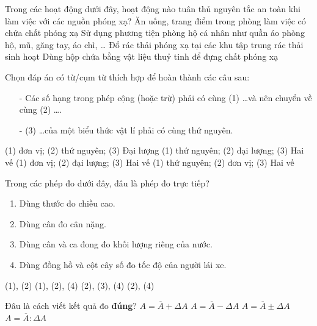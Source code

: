 \begin{ex}
	Trong các hoạt động dưới đây, hoạt động nào tuân thủ nguyên tắc an toàn khi làm việc với các nguồn phóng xạ?
	\choice
	{Ăn uống, trang điểm trong phòng làm việc có chứa chất phóng xạ}
	{\True Sử dụng phương tiện phòng hộ cá nhân như quần áo phòng hộ, mũ, găng tay, áo chì, \dots}
	{Đổ rác thải phóng xạ tại các khu tập trung rác thải sinh hoạt}
	{Dùng hộp chứa bằng vật liệu thuỷ tinh để đựng chất phóng xạ}
	
	\loigiai{}
\end{ex}
\begin{ex}
	Chọn đáp án có từ/cụm từ thích hợp để hoàn thành các câu sau:
	\begin{itemize}
		\item[-] Các số hạng trong phép cộng (hoặc trừ) phải có cùng (1) \dots và nên chuyển về cùng (2) \dots.
		\item[-] (3) \dots của một biểu thức vật lí phải có cùng thứ nguyên.
	\end{itemize}
	\choice
	{(1) đơn vị; (2) thứ nguyên; (3)  Đại lượng}
	{(1) thứ nguyên; (2) đại lượng; (3) Hai vế}
	{(1) đơn vị; (2) đại lượng; (3) Hai vế}
	{\True (1) thứ nguyên; (2) đơn vị; (3) Hai vế}
	\loigiai{}
\end{ex}
\begin{ex}
	Trong các phép đo dưới đây, đâu là phép đo trực tiếp?
	\begin{enumerate}[label=(\arabic*)]
		\item Dùng thước đo chiều cao.
		\item Dùng cân đo cân nặng.
		\item Dùng cân và ca đong đo khối lượng riêng của nước.
		\item Dùng đồng hồ và cột cây số đo tốc độ của người lái xe.
	\end{enumerate}
	\choice
	{\True (1), (2)}
	{(1), (2), (4)}
	{(2), (3), (4)}
	{(2), (4)}
	\loigiai{}
\end{ex}
\begin{ex}
	Đâu là cách viết kết quả đo \textbf{đúng}?
	\choice
	{$A=\overline{A}+\Delta A$}
	{$A=\overline{A}-\Delta A$}
	{\True $A=\overline{A}\pm\Delta A$}
	{$A=\overline{A}:\Delta A$}
	\loigiai{}
\end{ex}

